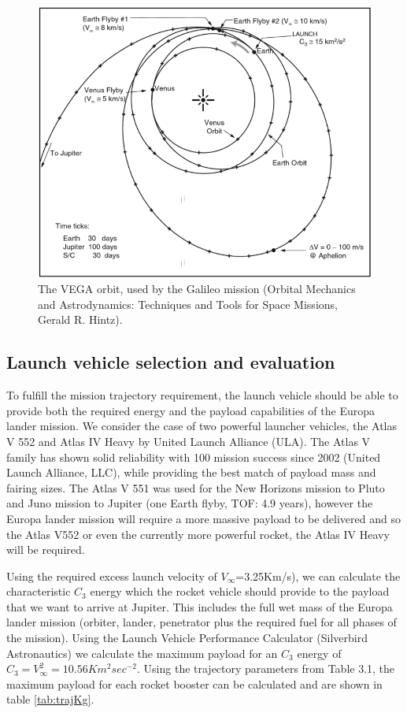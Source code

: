 \begin{figure}[h!]
\centering
\includegraphics[width=1\textwidth]{figures/Orbiter/VEEGA.png}
\caption{The  VEGA orbit, used by the Galileo mission (Orbital Mechanics and Astrodynamics: Techniques and Tools for Space Missions, Gerald R. Hintz).}
\end{figure}
\subsection{Launch vehicle selection and evaluation}
To fulfill the mission trajectory requirement, the launch vehicle should be able to provide both the required energy and the payload capabilities of the Europa lander mission. We consider the case of two powerful launcher vehicles, the Atlas V 552 and Atlas IV Heavy by United Launch Alliance (ULA). The Atlas V family has shown solid reliability with 100 mission success since 2002 (United Launch Alliance, LLC), while providing the best match of payload mass and fairing sizes. The Atlas V 551 was used for the New Horizons mission to Pluto and Juno mission to Jupiter (one Earth flyby, TOF: 4.9 years), however the Europa lander mission will require a more massive payload to be delivered and so the Atlas V552 or even the currently more powerful rocket, the Atlas IV Heavy will be required. 

Using the required excess launch velocity of  $V_{\infty}$=3.25Km/s), we can calculate the characteristic $C_3$ energy which the rocket vehicle should provide to the payload that we want to arrive at Jupiter. This includes the full wet mass of the Europa lander mission (orbiter, lander, penetrator plus the required fuel for all phases of the mission). Using the Launch Vehicle Performance Calculator (Silverbird Astronautics) 
we calculate the maximum payload for an $C_3$ energy of $C_{3}=V_{\infty}^{2}=10.56 Km^2sec^{-2}$. Using the trajectory parameters from Table 3.1, the maximum payload for each rocket booster can be calculated and are shown in table \ref{tab:trajKg}.

